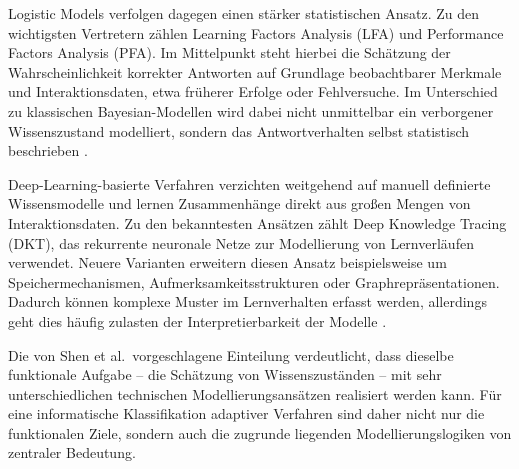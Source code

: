 Logistic Models verfolgen dagegen einen stärker statistischen Ansatz. Zu
den wichtigsten Vertretern zählen Learning Factors Analysis (LFA) und
Performance Factors Analysis (PFA). Im Mittelpunkt steht hierbei die
Schätzung der Wahrscheinlichkeit korrekter Antworten auf Grundlage
beobachtbarer Merkmale und Interaktionsdaten, etwa früherer Erfolge oder
Fehlversuche. Im Unterschied zu klassischen Bayesian-Modellen wird dabei
nicht unmittelbar ein verborgener Wissenszustand modelliert, sondern das
Antwortverhalten selbst statistisch beschrieben \citep{Shen2024}.

Deep-Learning-basierte Verfahren verzichten weitgehend auf manuell
definierte Wissensmodelle und lernen Zusammenhänge direkt aus großen
Mengen von Interaktionsdaten. Zu den bekanntesten Ansätzen zählt Deep
Knowledge Tracing (DKT), das rekurrente neuronale Netze zur Modellierung
von Lernverläufen verwendet. Neuere Varianten erweitern diesen Ansatz
beispielsweise um Speichermechanismen, Aufmerksamkeitsstrukturen oder
Graphrepräsentationen. Dadurch können komplexe Muster im Lernverhalten
erfasst werden, allerdings geht dies häufig zulasten der
Interpretierbarkeit der Modelle \citep{Shen2024}.

Die von Shen et al.~vorgeschlagene Einteilung verdeutlicht, dass
dieselbe funktionale Aufgabe -- die Schätzung von Wissenszuständen --
mit sehr unterschiedlichen technischen Modellierungsansätzen realisiert
werden kann. Für eine informatische Klassifikation adaptiver Verfahren
sind daher nicht nur die funktionalen Ziele, sondern auch die zugrunde
liegenden Modellierungslogiken von zentraler Bedeutung.


